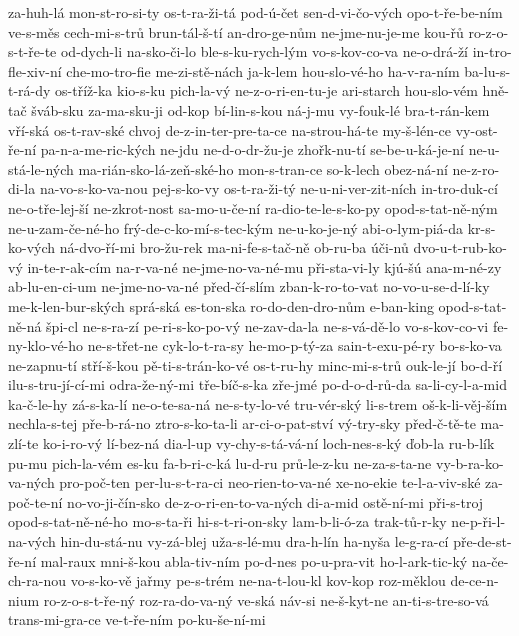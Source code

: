 za-huh-lá
mon-st-ro-si-ty
os-t-ra-ži-tá
pod-ú-čet
sen-d-vi-čo-vých
opo-t-ře-be-ním
ve-s-měs
cech-mi-s-trů
brun-tál-š-tí
an-dro-ge-nům
ne-jme-nu-je-me
kou-řů
ro-z-o-s-t-ře-te
od-dych-li
na-sko-či-lo
ble-s-ku-rych-lým
vo-s-kov-co-va
ne-o-drá-ží
in-tro-fle-xiv-ní
che-mo-tro-fie
me-zi-stě-nách
ja-k-lem
hou-slo-vé-ho
ha-v-ra-ním
ba-lu-s-t-rá-dy
os-tříž-ka
kio-s-ku
pich-la-vý
ne-z-o-ri-en-tu-je
ari-starch
hou-slo-vém
hně-tač
šváb-sku
za-ma-sku-ji
od-kop
bí-lin-s-kou
ná-j-mu
vy-fouk-lé
bra-t-rán-kem
vří-ská
os-t-rav-ské
chvoj
de-z-in-ter-pre-ta-ce
na-strou-há-te
my-š-lén-ce
vy-ost-ře-ní
pa-n-a-me-ric-kých
ne-jdu
ne-d-o-dr-žu-je
zhořk-nu-tí
se-be-u-ká-je-ní
ne-u-stá-le-ných
ma-rián-sko-lá-zeň-ské-ho
mon-s-tran-ce
so-k-lech
obez-ná-ní
ne-z-ro-di-la
na-vo-s-ko-va-nou
pej-s-ko-vy
os-t-ra-ži-tý
ne-u-ni-ver-zit-ních
in-tro-duk-cí
ne-o-tře-lej-ší
ne-zkrot-nost
sa-mo-u-če-ní
ra-dio-te-le-s-ko-py
opod-s-tat-ně-ným
ne-u-zam-če-né-ho
frý-de-c-ko-mí-s-tec-kým
ne-u-ko-je-ný
abi-o-lym-piá-da
kr-s-ko-vých
ná-dvo-ří-mi
bro-žu-rek
ma-ni-fe-s-tač-ně
ob-ru-ba
úči-nů
dvo-u-t-rub-ko-vý
in-te-r-ak-cím
na-r-va-né
ne-jme-no-va-né-mu
při-sta-vi-ly
kjú-šú
ana-m-né-zy
ab-lu-en-ci-um
ne-jme-no-va-né
před-čí-slím
zban-k-ro-to-vat
no-vo-u-se-d-lí-ky
me-k-len-bur-ských
sprá-ská
es-ton-ska
ro-do-den-dro-nům
e-ban-king
opod-s-tat-ně-ná
špi-cl
ne-s-ra-zí
pe-ri-s-ko-po-vý
ne-zav-da-la
ne-s-vá-dě-lo
vo-s-kov-co-vi
fe-ny-klo-vé-ho
ne-s-třet-ne
cyk-lo-t-ra-sy
he-mo-p-tý-za
sain-t-exu-pé-ry
bo-s-ko-va
ne-zapnu-tí
stří-š-kou
pě-ti-s-trán-ko-vé
os-t-ru-hy
minc-mi-s-trů
ouk-le-jí
bo-d-ří
ilu-s-tru-jí-cí-mi
odra-že-ný-mi
tře-bíč-s-ka
zře-jmé
po-d-o-d-rů-da
sa-li-cy-l-a-mid
ka-č-le-hy
zá-s-ka-lí
ne-o-te-sa-ná
ne-s-ty-lo-vé
tru-vér-ský
li-s-trem
oš-k-li-věj-ším
nechla-s-tej
pře-b-rá-no
ztro-s-ko-ta-li
ar-ci-o-pat-ství
vý-try-sky
před-č-tě-te
ma-zlí-te
ko-i-ro-vý
lí-bez-ná
dia-l-up
vy-chy-s-tá-vá-ní
loch-nes-s-ký
ďob-la
ru-b-lík
pu-mu
pich-la-vém
es-ku
fa-b-ri-c-ká
lu-d-ru
prů-le-z-ku
ne-za-s-ta-ne
vy-b-ra-ko-va-ných
pro-poč-ten
per-lu-s-t-ra-ci
neo-rien-to-va-né
xe-no-ekie
te-l-a-viv-ské
za-poč-te-ní
no-vo-ji-čín-sko
de-z-o-ri-en-to-va-ných
di-a-mid
ostě-ní-mi
při-s-troj
opod-s-tat-ně-né-ho
mo-s-ta-ři
hi-s-t-ri-on-sky
lam-b-li-ó-za
trak-tů-r-ky
ne-p-ři-l-na-vých
hin-du-stá-nu
vy-zá-blej
uža-s-lé-mu
dra-h-lín
ha-nyša
le-g-ra-cí
pře-de-st-ře-ní
mal-raux
mni-š-kou
abla-tiv-ním
po-d-nes
po-u-pra-vit
ho-l-ark-tic-ký
na-če-ch-ra-nou
vo-s-ko-vě
jařmy
pe-s-trém
ne-na-t-lou-kl
kov-kop
roz-měklou
de-ce-n-nium
ro-z-o-s-t-ře-ný
roz-ra-do-va-ný
ve-ská
náv-si
ne-š-kyt-ne
an-ti-s-tre-so-vá
trans-mi-gra-ce
ve-t-ře-ním
po-ku-še-ní-mi
